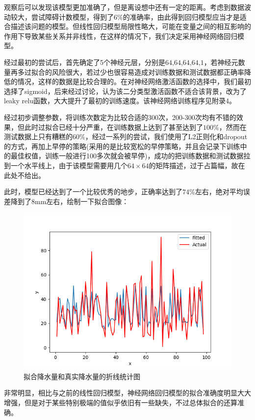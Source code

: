 \documentclass[UTF8, a4paper]{ctexart}
\begin{document}
观察后可以发现该模型更加准确了，但是离设想中还有一定的距离。考虑到数据波动较大，尝试障碍计数模型，得到了$6\%$的准确率，由此得到回归模型应当才是适合描述该问题的模型。但线性回归模型局限性略大，可能在变量之间的相互影响的作用下导致某些关系并非线性，在这样的情况下，我们决定采用神经网络回归模型。

经过最初的尝试后，首先确定了5个神经元层，分别是$64$,$64$,$64$,$64$,$1$，若神经元数量再多过拟合的风险很大，若过少也很容易造成对训练数据和测试数据都正确率降低的情况，这样的数据是比较合理的。在对神经网络激活函数的选择中，我们最初选择了sigmoid，后来经过讨论，认为该二分类型激活函数不适合该背景，改为了leaky relu函数，大大提升了最初的训练速度。该神经网络训练程序见附录4。

经过初步调整参数，将训练次数定为比较合适的300次，200-300次均有不错的效果，但此时过拟合已经十分严重，在训练数据上达到了甚至达到了$100\%$，然而在测试数据上只有糟糕的$60\%$，经过一系列的尝试，我们使用了L2正则化和dropout的方式，再加上早停的策略(采用的是比较宽松的早停策略，并且会记录下训练中的最佳权值，训练一般进行100多次就会被早停)，成功的把训练数据和测试数据拉到一个水平线上，由于该模型需要用几个$64\times64$的矩阵描述，过于占篇幅，故在此处不给出。

此时，模型已经达到了一个比较优秀的地步，正确率达到了$74\%$左右，绝对平均误差降到了$8$mm左右，绘制一下拟合图像：

\begin{figure}[h!]
	\centering
	\includegraphics[scale=0.5]{success.png}
	\caption{拟合降水量和真实降水量的折线统计图}
\end{figure}

非常明显，相比与之前的线性回归模型，神经网络回归模型的拟合准确度明显大大增强，但是对于某些特别极端的值似乎依旧有一些缺失，不过总体拟合的还算准确。
\end{document}
